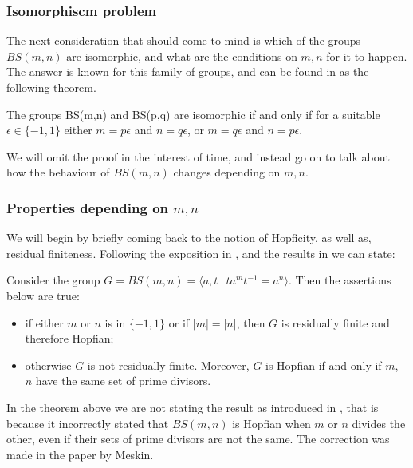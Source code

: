 
\subsubsection{Isomorphiscm problem}
The next consideration that should come to mind is which of the groups $BS(m,n)$ are isomorphic, and what are the conditions on $m,n$ for it to happen. The answer is known for this family of groups, and can be found in \cite{Mol91} as the following theorem.

\begin{theorem} \label{BSisom}
    The groups BS(m,n) and BS(p,q) are isomorphic if and only if for a suitable $\epsilon \in \{-1,1\}$ either $m = p\epsilon$ and $n = q\epsilon$, or $m = q\epsilon$ and $n = p\epsilon$.
\end{theorem}

We will omit the proof in the interest of time, and instead go on to talk about how the behaviour of $BS(m,n)$ changes depending on $m,n$.

\subsubsection{Properties depending on $m,n$}
We will begin by briefly coming back to the notion of Hopficity, as well as, residual finiteness. Following the exposition in \cite[III.21]{Ha00}, and the results in \cite{CoLe83} we can state:

\begin{theorem}
    Consider the group $G = BS(m,n) = \langle a,t \: | \: ta^mt^{-1} = a^n \rangle$. Then the assertions below are true:
    \begin{itemize}
        \item if either $m$ or $n$ is in $\{-1,1\}$ or if $|m| = |n|$, then $G$ is residually finite and therefore Hopfian;
        \item otherwise $G$ is not residually finite. Moreover, $G$ is Hopfian if and only if $m$, $n$ have the same set of prime divisors. 
    \end{itemize}
\end{theorem}

\begin{remark}
    In the theorem above we are not stating the result as introduced in \cite{BaSo62}, that is because it incorrectly stated that $BS(m,n)$ is Hopfian when $m$ or $n$ divides the other, even if their sets of prime divisors are not the same. The correction was made in the paper \cite{Me72} by Meskin.
\end{remark}

